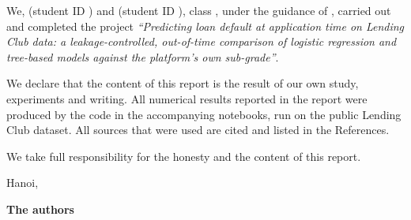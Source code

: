 We,  (student ID ) and  (student ID ), class , under the guidance of \textbf{}, carried out and completed the project \textit{``Predicting loan default at application time on Lending Club data: a leakage-controlled, out-of-time comparison of logistic regression and tree-based models against the platform's own sub-grade''}.

We declare that the content of this report is the result of our own study, experiments and writing. All numerical results reported in the report were produced by the code in the accompanying notebooks, run on the public Lending Club dataset. All sources that were used are cited and listed in the References. 

We take full responsibility for the honesty and the content of this report.

\vspace{6pt}
\hspace{8.3cm}Hanoi, 

\hspace{9cm}\textbf{The authors}

\vspace{2cm}
\hspace{8.2cm}\textbf{}

\hspace{8.2cm}\textbf{}
